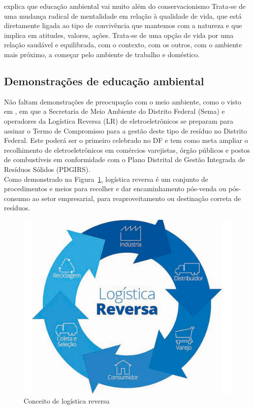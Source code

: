  explica que educação ambiental vai muito além do conservacionismo
Trata-se de uma mudança radical de mentalidade em
relação à qualidade de vida, que está diretamente ligada
ao tipo de convivência que mantemos com a natureza e
que implica em atitudes, valores, ações. Trata-se de uma
opção de vida por uma relação saudável e equilibrada,
com o contexto, com os outros, com o ambiente mais
próximo, a começar pelo ambiente de trabalho e
doméstico.\\

\subsection{Demonstrações de educação ambiental}

Não faltam demonstrações de preocupação com o meio ambiente, como o visto em , em que a Secretaria de Meio Ambiente do Distrito Federal (Sema) e operadores da Logística Reversa (LR) de eletroeletrônicos se preparam para assinar o Termo de Compromisso para a gestão deste tipo de resíduo no Distrito Federal. Este poderá ser o primeiro celebrado no DF e tem como meta ampliar o recolhimento de eletroeletrônicos em comércios varejistas, órgão públicos e postos de combustíveis em conformidade com o Plano Distrital de Gestão Integrada de Resíduos Sólidos (PDGIRS).\\

Como demonstrado na Figura~\ref{fig:logistica-reversa}, logística reversa é um conjunto de procedimentos e meios para recolher e dar encaminhamento pós-venda ou pós-consumo ao setor empresarial, para reaproveitamento ou destinação correta de resíduos.

\begin{figure}[h]
    \centering
    \includegraphics[width=0.7\linewidth]{fig/Logistica-Reversa}
    \caption[Conceito de logística reversa]{Conceito de logística reversa}
    \label{fig:logistica-reversa}
\end{figure}



